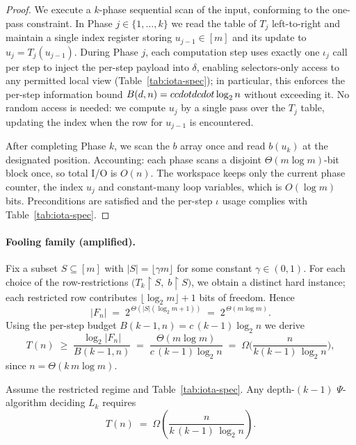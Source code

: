 \begin{proof}
We execute a $k$-phase sequential scan of the input, conforming to the one-pass constraint. In Phase $j\in\{1,\dots,k\}$ we read the table of $T_j$ left-to-right and maintain a single index register storing $u_{j-1}\in[m]$ and its update to $u_j=T_j(u_{j-1})$. During Phase $j$, each computation step uses exactly one $\iota_j$ call per step to inject the per-step payload into $\delta$, enabling selectors-only access to any permitted local view (Table~\ref{tab:iota-spec}); in particular, this enforces the per-step information bound $B(d,n)=c \\cdot d \\cdot \log_{2} n$ without exceeding it. No random access is needed: we compute $u_j$ by a single pass over the $T_j$ table, updating the index when the row for $u_{j-1}$ is encountered.

After completing Phase $k$, we scan the $b$ array once and read $b(u_k)$ at the designated position. Accounting: each phase scans a disjoint $\Theta(m\log m)$-bit block once, so total I/O is $O(n)$. The workspace keeps only the current phase counter, the index $u_j$ and constant-many loop variables, which is $O(\log m)$ bits. Preconditions are satisfied and the per-step $\iota$ usage complies with Table~\ref{tab:iota-spec}.
\end{proof}

\paragraph{Fooling family (amplified).}
Fix a subset $S\subseteq [m]$ with $|S|=\lfloor \gamma m\rfloor$ for some constant $\gamma\in(0,1)$. For each choice of the row-restrictions $\big(T_k\!\upharpoonright S,\; b\!\upharpoonright S\big)$, we obtain a distinct hard instance; each restricted row contributes $\lfloor\log_{2} m\rfloor+1$ bits of freedom. Hence
\[
|F_n| \;=\; 2^{\,\Theta(|S|(\log_{2} m+1))} \;=\; 2^{\,\Theta(m\log m)}.
\]
Using the per-step budget $B(k-1,n)=c\,(k-1)\log_{2}n$ we derive
\[
T(n)\;\ge\;\frac{\log_{2}|F_n|}{B(k-1,n)}
\;=\;\frac{\Theta(m\log m)}{c\,(k-1)\log_{2}n}
\;=\;\Omega\!\Big(\frac{n}{k(k-1)\,\log_{2}n}\Big),
\]
since $n=\Theta(k\,m\log m)$.

\begin{theorem}[LB at depth $k{-}1$]\label{Lk:lb-main}
Assume the restricted regime and Table~\ref{tab:iota-spec}. Any depth-$(k{-}1)$ $\Psi$-algorithm deciding $L_k$ requires
\[
 T(n) \;=\; \Omega\!\left(\frac{n}{k\,(k{-}1)\,\log_{2} n}\right).
\]
\end{theorem}

